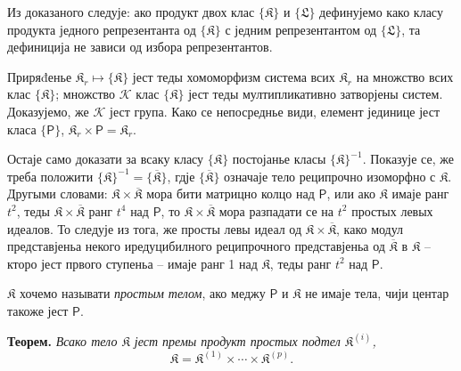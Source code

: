 \documentclass[11pt]{article}
\begin{document}
Из доказаного следује: ако продукт двох клас \(\{\mathfrak K\}\) и \(\{\mathfrak L\}\) дефинујемо како класу продукта једного репрезентанта од \(\{\mathfrak K\}\) с једним репрезентантом од \(\{\mathfrak L\}\), та дефиниција не зависи од избора репрезентантов.

Приряđенье \(\mathfrak K_r\mapsto\{\mathfrak K\}\) јест теды хомоморфизм система всих \(\mathfrak K_r\) на множство всих клас \(\{\mathfrak K\}\); множство \(\mathscr K\) клас \(\{\mathfrak K\}\) јест теды мултипликативно затворјены систем. Доказујемо, же \(\mathscr K\) јест група. Како се непосреднье види, елемент јединице јест класа \(\{\mathsf P\}\), \(\mathfrak K_r\times\mathsf P=\mathfrak K_r\).

Остаје само доказати за всаку класу \(\{\mathfrak K\}\) постојанье класы \(\{\mathfrak K\}^{-1}\). Показује се, же треба положити \(\{\mathfrak K\}^{-1}=\{\overline{\mathfrak K}\}\), гдје \(\{\overline{\mathfrak K}\}\) означаје тело реципрочно изоморфно с \(\mathfrak K\). Другыми словами: \(\mathfrak K\times\overline{\mathfrak K}\) мора бити матрицно колцо над \(\mathsf P\), или ако \(\mathfrak K\) имаје ранг \(t^2\), теды \(\mathfrak K\times\overline{\mathfrak K}\) ранг \(t^4\) над \(\mathsf P\), то \(\mathfrak K\times\overline{\mathfrak K}\) мора разпадати се на \(t^2\) простых левых идеалов. То следује из тога, же просты левы идеал од \(\mathfrak K\times\overline{\mathfrak K}\), како модул представјеньа некого иредуцибилного реципрочного представјеньа од \(\overline{\mathfrak K}\) в \(\mathfrak K\) -- кторо јест првого ступеньа -- имаје ранг 1 над \(\mathfrak K\), теды ранг \(t^2\) над \(\mathsf P\).

\(\mathfrak K\) хочемо называти \emph{простым телом}, ако меджу \(\mathsf P\) и \(\mathfrak K\) не имаје тела, чији центар такоже јест \(\mathsf P\).

\textbf{Теорем.} \emph{Всако тело \(\mathfrak K\) јест премы продукт простых подтел \(\mathfrak K^{(i)}\),}
\[
\mathfrak K=\mathfrak K^{(1)}\times\cdots\times\mathfrak K^{(p)}.
\]
\end{document}
